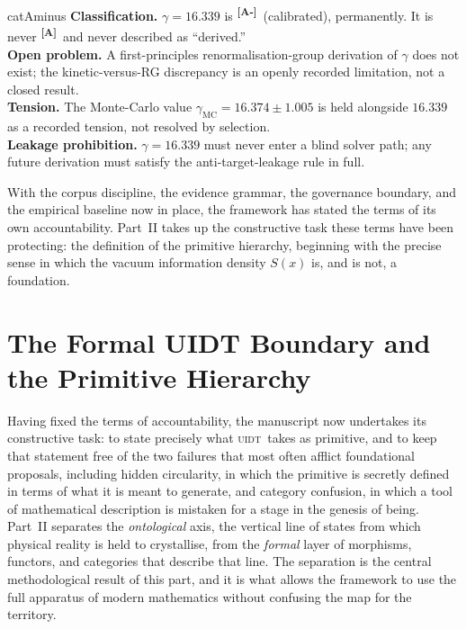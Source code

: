 \documentclass[12pt,a4paper,twoside]{article}
\theoremstyle{plain}
\theoremstyle{definition}
\theoremstyle{remark}
\newcommand{\UIDT}{\textsc{uidt}}
\newcommand{\catmark}[1]{\textsuperscript{\textsf{\textbf{[#1]}}}}
\newcommand{\Sx}{S(x)}
\newcommand{\GammaGeom}{16.339} %
\newcommand{\GammaMC}{16.374 \pm 1.005} %
\begin{document}
\begin{evidencebox}{catAminus}
\textbf{Classification.} $\gamma = \GammaGeom$ is \catmark{A-}\ (calibrated), permanently. It is never \catmark{A}\ and never described as
``derived.''\\[0.3em]
\textbf{Open problem.} A first-principles renormalisation-group derivation of $\gamma$ does not exist; the kinetic-versus-RG discrepancy is an openly recorded
limitation, not a closed result.\\[0.3em]
\textbf{Tension.} The Monte-Carlo value $\gamma_{\mathrm{MC}} = \GammaMC$ is held alongside $16.339$ as a recorded tension, not resolved by
selection.\\[0.3em]
\textbf{Leakage prohibition.} $\gamma = 16.339$ must never enter a blind solver path; any future derivation must satisfy the anti-target-leakage rule in full.
\end{evidencebox}

\noindent With the corpus discipline, the evidence grammar, the governance boundary, and the empirical baseline now in place, the framework has stated the terms of its own accountability. Part~II takes up the constructive task these terms have been protecting: the definition of the primitive hierarchy, beginning with the precise sense in which the vacuum information density $\Sx$ is, and is not, a foundation.

\part{The Formal UIDT Boundary and the Primitive Hierarchy}
\label{part:primitive-hierarchy}

\noindent Having fixed the terms of accountability, the manuscript now undertakes its constructive task: to state precisely what \UIDT\ takes as primitive, and to keep that statement free of the two failures that most often afflict foundational proposals, including hidden circularity, in which the primitive is secretly defined in terms of what it is meant to generate, and category confusion, in which a tool of mathematical description is mistaken for a stage in the genesis of being. Part~II separates the \emph{ontological} axis, the vertical line of states from which physical reality is held to crystallise, from the \emph{formal} layer of morphisms, functors, and categories that describe that line. The separation is the central methodological result of this part, and it is what allows the framework to use the full apparatus of modern mathematics without confusing the map for the territory.
\end{document}
